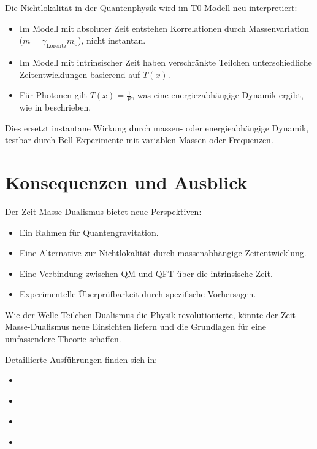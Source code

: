 \documentclass[a4paper,12pt]{article}
\newcommand{\Tfield}{T(x)}
\newcommand{\gammaf}{\gamma_{\text{Lorentz}}}
\begin{document}
	Die Nichtlokalität in der Quantenphysik wird im T0-Modell neu interpretiert:
	\begin{itemize}
		\item Im Modell mit absoluter Zeit entstehen Korrelationen durch Massenvariation (\( m = \gammaf m_0 \)), nicht instantan.
		\item Im Modell mit intrinsischer Zeit haben verschränkte Teilchen unterschiedliche Zeitentwicklungen basierend auf \(\Tfield\).
		\item Für Photonen gilt \(\Tfield = \frac{1}{E}\), was eine energiezabhängige Dynamik ergibt, wie in \cite{pascher_photons_2025} beschrieben.
	\end{itemize}
	
	Dies ersetzt instantane Wirkung durch massen- oder energieabhängige Dynamik, testbar durch Bell-Experimente mit variablen Massen oder Frequenzen.
	
	\section{Konsequenzen und Ausblick}
	
	Der Zeit-Masse-Dualismus bietet neue Perspektiven:
	\begin{itemize}
		\item Ein Rahmen für Quantengravitation.
		\item Eine Alternative zur Nichtlokalität durch massenabhängige Zeitentwicklung.
		\item Eine Verbindung zwischen QM und QFT über die intrinsische Zeit.
		\item Experimentelle Überprüfbarkeit durch spezifische Vorhersagen.
	\end{itemize}
	
	Wie der Welle-Teilchen-Dualismus die Physik revolutionierte, könnte der Zeit-Masse-Dualismus neue Einsichten liefern und die Grundlagen für eine umfassendere Theorie schaffen.
	
	Detaillierte Ausführungen finden sich in:
	\begin{itemize}
		\item \cite{pascher_planck_2025}
		\item \cite{pascher_params_2025}
		\item \cite{pascher_photons_2025}
		\item \cite{pascher_quantum_2025}
	\end{itemize}
	
\end{document}
